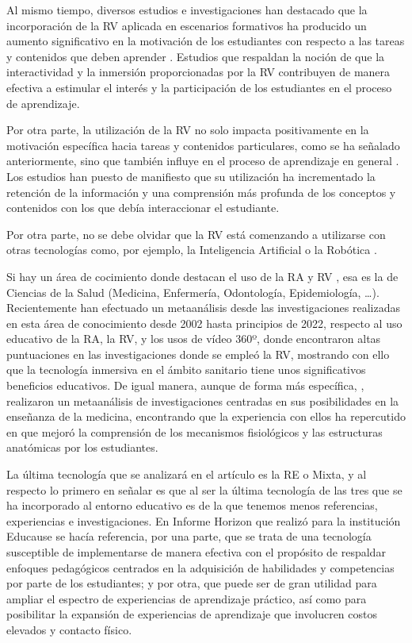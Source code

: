 \documentclass[spanish]{textolivre}
\begin{document}
Al mismo tiempo, diversos estudios e investigaciones han destacado que la incorporación de la RV aplicada en escenarios formativos ha producido un aumento significativo en la motivación de los estudiantes con respecto a las tareas y contenidos que deben aprender \cite{yang2018examining,bourgeois_bougrine_2020,mcgovern2020application,fromm2021more}. Estudios que respaldan la noción de que la interactividad y la inmersión proporcionadas por la RV contribuyen de manera efectiva a estimular el interés y la participación de los estudiantes en el proceso de aprendizaje.

Por otra parte, la utilización de la RV no solo impacta positivamente en la motivación específica hacia tareas y contenidos particulares, como se ha señalado anteriormente, sino que también influye en el proceso de aprendizaje en general \cite{calderon2020realidad,tang2020evaluating,toala2020realidad}. Los estudios han puesto de manifiesto que su utilización ha incrementado la retención de la información y una comprensión más profunda de los conceptos y contenidos con los que debía interaccionar el estudiante.

Por otra parte, no se debe olvidar que la RV está comenzando a utilizarse con otras tecnologías como, por ejemplo, la Inteligencia Artificial o la Robótica \cite{alonso_2019,cao2022curriculum}.

Si hay un área de cocimiento donde destacan el uso de la RA y RV , esa es la de Ciencias de la Salud (Medicina, Enfermería, Odontología, Epidemiología, …). Recientemente \textcite{jacobs2022narrative} han efectuado un metaanálisis desde las investigaciones realizadas en esta área de conocimiento desde 2002 hasta principios de 2022, respecto al uso educativo de la RA, la RV, y los usos de vídeo 360º, donde encontraron altas puntuaciones en las investigaciones donde se empleó la RV, mostrando con ello  que la tecnología inmersiva en el ámbito sanitario tiene unos significativos beneficios educativos. De igual manera, aunque de forma más específica, \textcite{Zeeshan_2022}, realizaron un metaanálisis de investigaciones centradas en sus posibilidades en la enseñanza de la medicina, encontrando que la experiencia con ellos ha repercutido en que mejoró la comprensión de los mecanismos fisiológicos y las estructuras anatómicas por los estudiantes.

La última tecnología que se analizará en el artículo es la RE o Mixta, y al respecto lo primero en señalar es que al ser la última tecnología de las tres que se ha incorporado al entorno educativo es de la que tenemos menos referencias, experiencias e investigaciones. En Informe Horizon que \textcite{brown2020educause} realizó para la institución Educause se hacía referencia, por una parte, que se trata de una tecnología susceptible de implementarse de manera efectiva con el propósito de respaldar enfoques pedagógicos centrados en la adquisición de habilidades y competencias por parte de los estudiantes; y por otra, que puede ser de gran utilidad para ampliar el espectro de experiencias de aprendizaje práctico, así como para posibilitar la expansión de experiencias de aprendizaje que involucren costos elevados y contacto físico.
\end{document}
